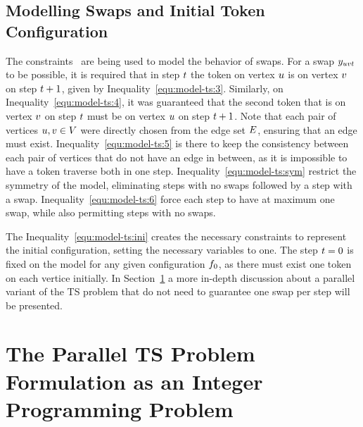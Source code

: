 \documentclass[msc,english,table,xcdraw]{ppgccufmg}
\begin{document}



\subsection{Modelling Swaps and Initial Token Configuration}
\label{sec:formulation_ts:swaps}

The constraints~ are being used to 
model the behavior of swaps.
For a swap $y_{uvt}$ to be possible, it is required that in step $t$ 
the token on vertex $u$ is on vertex $v$ on step $t+1$, 
given by Inequality~\ref{equ:model-ts:3}.
Similarly, on Inequality~\ref{equ:model-ts:4}, it was guaranteed that the second 
token that is on vertex $v$ on step $t$ must be on vertex 
$u$ on step $t+1$.
Note that each pair of vertices $u,v \in V$ were 
directly chosen from the edge set $E$, ensuring that an edge must exist.
Inequality~\ref{equ:model-ts:5} is there to keep the consistency between each 
pair of vertices that do not have an edge in between, as it is impossible to have 
a token traverse both in one step.
Inequality~\ref{equ:model-ts:sym} restrict the symmetry of the model, eliminating
steps with no swaps followed by a step with a swap.
Inequality~\ref{equ:model-ts:6} force each step to have at maximum one swap, 
while also permitting steps with no swaps.

The Inequality~\ref{equ:model-ts:ini} creates the necessary constraints
to represent the initial configuration, setting the necessary variables
to one.
The step $t = 0$ is fixed on the model for any given configuration
$f_{0}$, as there must exist one token on each vertice initially.
In Section~\ref{sec:formulation_pts} a more in-depth discussion about a 
parallel variant of the TS problem that do not need to guarantee one 
swap per step will be presented.

\section{The Parallel TS Problem Formulation as an Integer Programming Problem}
\label{sec:formulation_pts}
\end{document}
